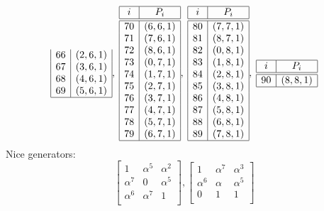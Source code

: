 {$$\begin{array}{|c|c|c|}
66 & ( 2, 6, 1 )\\
67 & ( 3, 6, 1 )\\
68 & ( 4, 6, 1 )\\
69 & ( 5, 6, 1 )\\
\hline
\end{array}
, \;
\begin{array}{|c|c|c|}
\hline
i & P_{i}\\
\hline
\hline
70 & ( 6, 6, 1 )\\
71 & ( 7, 6, 1 )\\
72 & ( 8, 6, 1 )\\
73 & ( 0, 7, 1 )\\
74 & ( 1, 7, 1 )\\
75 & ( 2, 7, 1 )\\
76 & ( 3, 7, 1 )\\
77 & ( 4, 7, 1 )\\
78 & ( 5, 7, 1 )\\
79 & ( 6, 7, 1 )\\
\hline
\end{array}
, \;
\begin{array}{|c|c|c|}
\hline
i & P_{i}\\
\hline
\hline
80 & ( 7, 7, 1 )\\
81 & ( 8, 7, 1 )\\
82 & ( 0, 8, 1 )\\
83 & ( 1, 8, 1 )\\
84 & ( 2, 8, 1 )\\
85 & ( 3, 8, 1 )\\
86 & ( 4, 8, 1 )\\
87 & ( 5, 8, 1 )\\
88 & ( 6, 8, 1 )\\
89 & ( 7, 8, 1 )\\
\hline
\end{array}
, \;
\begin{array}{|c|c|c|}
\hline
i & P_{i}\\
\hline
\hline
90 & ( 8, 8, 1 )\\
\hline
\end{array}
$$}%
Nice generators:\\
$$
\left[
\begin{array}{*{3}{r}}
1 & \alpha^{5} & \alpha^{2}\\
\alpha^{7} & 0 & \alpha^{5}\\
\alpha^{6} & \alpha^{7} & 1\\
\end{array}
\right]
, 
\left[
\begin{array}{*{3}{r}}
1 & \alpha^{7} & \alpha^{3}\\
\alpha^{6} & \alpha  & \alpha^{5}\\
0 & 1 & 1\\
\end{array}
\right]
$$
